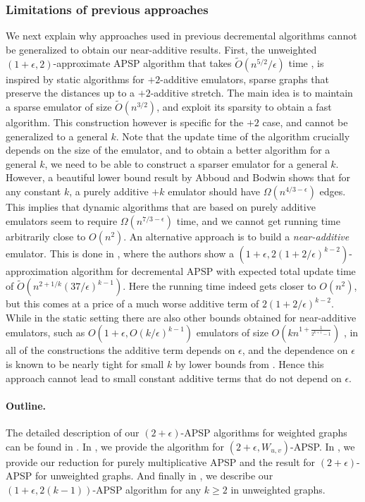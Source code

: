 \subsubsection{Limitations of previous approaches} 
We next explain why approaches used in previous decremental algorithms cannot be generalized to obtain our near-additive results. First, the unweighted $(1+\epsilon,2)$-approximate APSP algorithm that takes $\tilde{O}(n^{5/2}/\epsilon)$ time \cite{HKN2016}, is inspired by static algorithms for $+2$-additive emulators, sparse graphs that preserve the distances up to a $+2$-additive stretch. The main idea is to maintain a sparse emulator of size $\tilde{O}(n^{3/2})$, and exploit its sparsity to obtain a fast algorithm. This construction however is specific for the $+2$ case, and cannot be generalized to a general $k$. Note that the update time of the algorithm crucially depends on the size of the emulator, and to obtain a better algorithm for a general $k$, we need to be able to construct a sparser emulator for a general $k$.
However, a beautiful lower bound result by Abboud and Bodwin \cite{abboud20174} shows that for any constant $k$, a purely additive $+k$ emulator should have $\Omega(n^{4/3-\epsilon})$ edges. 
This implies that dynamic algorithms that are based on purely additive emulators seem to require $\Omega(n^{7/3-\epsilon})$ time, and we cannot get running time arbitrarily close to $O(n^2)$. An alternative approach is to build a \emph{near-additive} emulator. This is done in \cite{HKN14}, where the authors show a $(1+\epsilon, 2(1+2/\epsilon)^{k-2})$-approximation algorithm for decremental APSP with expected total update time of $\tilde{O}(n^{2+1/k} (37/\epsilon)^{k-1})$. Here the running time indeed gets closer to $O(n^2)$, but this comes at a price of a much worse additive term of $2(1+2/\epsilon)^{k-2}$. While in the static setting there are also other bounds obtained for near-additive emulators, such as $O(1+\epsilon,O(k/\epsilon)^{k-1})$ emulators of size $O(kn^{1+\frac{1}{2^{k+1}-1}})$ \cite{elkin2004,thorup2006spanners,abboud2018hierarchy,elkin2020near}, in all of the constructions the additive term depends on $\epsilon$, and the dependence on $\epsilon$ is known to be nearly tight for small $k$ by lower bounds from \cite{abboud2018hierarchy}. Hence this approach cannot lead to small constant additive terms that do not depend on $\epsilon$.


\paragraph{Outline.}
The detailed description of our $(2+\epsilon)$-APSP algorithms for weighted graphs can be found in . In , we provide the algorithm for $(2+\epsilon,W_{u,v})$-APSP. In , we provide our reduction for purely multiplicative APSP and the result for $(2+\epsilon)$-APSP for unweighted graphs. And finally in , we describe our $(1+\epsilon, 2(k-1))$-APSP algorithm for any $k \geq 2$ in unweighted graphs. 
